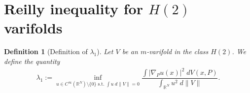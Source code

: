 \documentclass[12pt,english]{smfart} %
\newtheorem{theorem}{Theorem}[section]
\newtheorem{definition}[theorem]{Definition}
\theoremstyle{remark}
\newcommand{\R}{\mathbb{R}}
\begin{document}





%
%
  
 \section{Reilly inequality for $H(2)$ varifolds} 
 
 \medskip\begin{definition}[Definition of $\lambda_1$]  Let  $V$ be an $m$-varifold in the class $H(2)$. We define the quantity
 \begin{eqnarray} \lambda_1:=\inf_{u \in C^\infty(\mathbb{R}^N) \setminus \{0\} \text{ s.t. } \displaystyle\int  u \; d\|V\|=0} \dfrac{\displaystyle\int |\nabla_P u(x)|^2 \;d V(x,P)}{\displaystyle \int_{\mathbb{R}^N} u^2\;d\|V\|}. \label{definitionL}\end{eqnarray}
 \end{definition}
 
\end{document}
